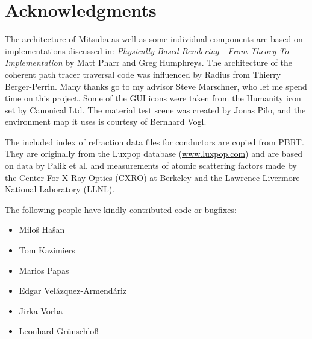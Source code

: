 \section{Acknowledgments}
The architecture of Mitsuba as well as some individual components are based on implementations discussed in: \emph{Physically Based Rendering - From Theory To Implementation} by Matt Pharr and Greg Humphreys.
The architecture of the coherent path tracer traversal code was influenced by Radius from Thierry Berger-Perrin.
Many thanks go to my advisor Steve Marschner, who let me spend time on this project.
Some of the GUI icons were taken from the Humanity icon set by Canonical Ltd.
The material test scene was created by Jonas Pilo, and the environment map
it uses is courtesy of Bernhard Vogl.

The included index of refraction data files for conductors are copied from
PBRT. They are originally from the Luxpop database (\url{www.luxpop.com}) 
and are based on data by Palik et al. \cite{Palik1998Handbook}
and measurements of atomic scattering factors made by the Center For
X-Ray Optics (CXRO) at Berkeley and the Lawrence Livermore National 
Laboratory (LLNL).

The following people have kindly contributed code or bugfixes:
\begin{itemize}
\item Milo\^{s} Ha\^{s}an
\item Tom Kazimiers
\item Marios Papas
\item Edgar Vel\'{a}zquez-Armend\'{a}riz
\item Jirka Vorba
\item Leonhard Gr\"unschlo\ss
\end{itemize}


